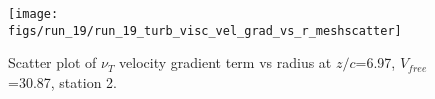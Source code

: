 \begin{figure}[H]
\centering
\texttt{[image: figs/run\_19/run\_19\_turb\_visc\_vel\_grad\_vs\_r\_meshscatter]}
\caption{Scatter plot of $\nu_T$ velocity gradient term vs radius at $z/c$=6.97, $V_{free}$=30.87, station 2.}
\label{fig:run_19_turb_visc_vel_grad_vs_r_meshscatter}
\end{figure}


